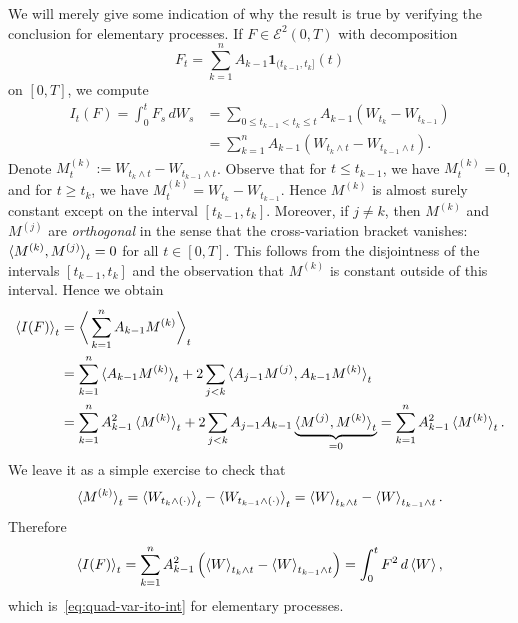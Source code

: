 We will merely give some indication of why the result is true by verifying the conclusion for elementary processes. If $F\in\mathcal{E}^2(0,T)$ with decomposition
\begin{equation*}
    F_t = \sum_{k=1}^n A_{k-1}\mathbf{1}_{(t_{k-1},t_k]}(t)
\end{equation*}
on $[0,T]$, we compute
\begin{align*}
    I_t(F) = \int_0^t F_s \,dW_s &= \sum_{0\le t_{k-1}<t_k\le t} A_{k-1}(W_{t_k}-W_{t_{k-1}}) \\
    &= \sum_{k=1}^n A_{k-1}(W_{t_k\wedge t}-W_{t_{k-1}\wedge t}).
\end{align*}
Denote $M^{(k)}_t := W_{t_k\wedge t}-W_{t_{k-1}\wedge t}$. Observe that for $t\le t_{k-1}$, we have $M^{(k)}_t=0$, and for $t\ge t_k$, we have $M^{(k)}_t=W_{t_k}-W_{t_{k-1}}$. Hence $M^{(k)}$ is almost surely constant except on the interval $[t_{k-1},t_k]$. Moreover, if $j\ne k$, then $M^{(k)}$ and $M^{(j)}$ are \emph{orthogonal} in the sense that the cross-variation bracket vanishes: $\braket{M^{(k)},M^{(j)}}_t=0$ for all $t\in [0,T]$. This follows from the disjointness of the intervals $[t_{k-1},t_k]$ and the observation that $M^{(k)}$ is constant outside of this interval. Hence we obtain
\begin{align*}
    \braket{I(F)}_t &= \bigg\langle \sum_{k=1}^n A_{k-1}M^{(k)} \bigg\rangle_t \\
    &= \sum_{k=1}^n \braket{A_{k-1}M^{(k)}}_t + 2\sum_{j<k} \braket{A_{j-1}M^{(j)}, A_{k-1}M^{(k)}}_t \\
    &= \sum_{k=1}^n A_{k-1}^2\braket{M^{(k)}}_t + 2\sum_{j<k} A_{j-1}A_{k-1}\underbrace{\braket{M^{(j)},M^{(k)}}_t}_{=0} = \sum_{k=1}^n A_{k-1}^2\braket{M^{(k)}}_t.
\end{align*}
We leave it as a simple exercise to check that
\begin{equation*}
    \braket{M^{(k)}}_t = \braket{W_{t_k\wedge(\cdot)}}_t - \braket{W_{t_{k-1}\wedge(\cdot)}}_t = \braket{W}_{t_k\wedge t} - \braket{W}_{t_{k-1}\wedge t}.
\end{equation*}
Therefore
\begin{equation*}
    \braket{I(F)}_t = \sum_{k=1}^n A_{k-1}^2\left(\braket{W}_{t_k\wedge t} - \braket{W}_{t_{k-1}\wedge t}\right) = \int_0^t F^2\,d\braket{W},
\end{equation*}
which is~\eqref{eq:quad-var-ito-int} for elementary processes.

